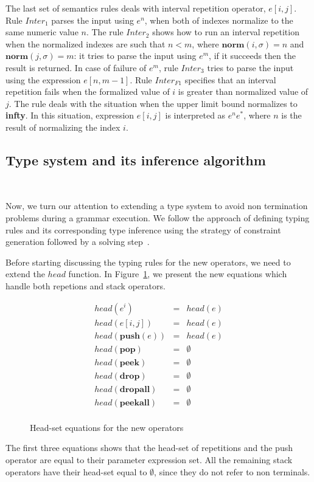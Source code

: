 \documentclass[preprint,12pt]{elsarticle}
\theoremstyle{definition}
\begin{document}
The last set of semantics rules deals with interval repetition operator,
$e[i,j]$. Rule $Inter_{1}$ parses the input using $e^n$, when both of indexes
normalize to the same numeric value $n$. The rule $Inter_2$ shows how to run
an interval repetition when the normalized indexes are such that $n < m$,
where $\mathbf{norm}(i,\sigma) = n$ and $\mathbf{norm}(j,\sigma) = m$:
it tries to parse the input using $e^m$, if it succeeds then the result is
returned. In case of failure of $e^m$, rule $Inter_3$ tries
to parse the input using the expression $e[n, m -1]$.
Rule $Inter_{F1}$ specifies that an interval repetition fails when the formalized value of $i$
is greater than normalized value of $j$.
The rule deals with the situation when the upper limit bound normalizes to \textbf{infty}.
In this situation, expression $e[i,j]$ is interpreted as $e^n e^*$, where $n$ is the
result of normalizing the index $i$.

\subsection{Type system and its inference algorithm}~\label{sec:typesystem}

Now, we turn our attention to extending a type system to avoid
non termination problems during a grammar execution. We follow
the approach of defining typing rules and its corresponding
type inference using the strategy of constraint generation
followed by a solving step~\cite{Ribeiro19,Cardoso23, Pottier05}.

Before starting discussing the typing rules for the new operators,
we need to extend the $head$ function. In Figure~\ref{fig:new-head-set},
we present the new equations which handle both repetions and stack
operators.

\begin{figure}[H]
  \[
    \begin{array}{lcl}
      head(e^i) & = & head(e)\\
      head(e[i,j]) & = & head(e)\\
      head(\mathbf{push}(e)) & = & head(e)\\
      head(\mathbf{pop}) & = & \emptyset\\
      head(\mathbf{peek}) & = & \emptyset\\
      head(\mathbf{drop}) & = & \emptyset\\
      head(\mathbf{dropall}) & = & \emptyset\\
      head(\mathbf{peekall}) & = & \emptyset\\
    \end{array}
  \]
  \caption{Head-set equations for the new operators}
  \label{fig:new-head-set}
\end{figure}
The first three equations shows that the head-set of
repetitions and the push operator are equal to their
parameter expression set. All the remaining stack operators
have their head-set equal to $\emptyset$, since they do not
refer to non terminals.
\end{document}
